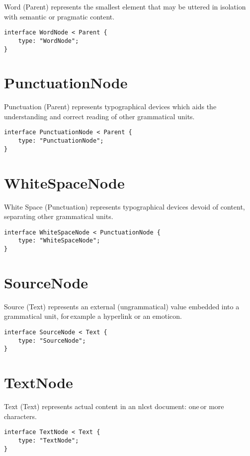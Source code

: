 Word (Parent) represents the smallest element that may be uttered in
isolation with semantic or pragmatic content.

\begin{lstlisting}
interface WordNode < Parent {
    type: "WordNode";
}
\end{lstlisting}

\section*{PunctuationNode}\label{punctuationnode}

Punctuation (Parent) represents typographical devices which aids the
understanding and correct reading of other grammatical units.

\begin{lstlisting}
interface PunctuationNode < Parent {
    type: "PunctuationNode";
}
\end{lstlisting}

\section*{WhiteSpaceNode}\label{whitespacenode}

White Space (Punctuation) represents typographical devices devoid of
content, separating other grammatical units.

\begin{lstlisting}
interface WhiteSpaceNode < PunctuationNode {
    type: "WhiteSpaceNode";
}
\end{lstlisting}

\section*{SourceNode}\label{sourcenode}

Source (Text) represents an external (ungrammatical) value embedded
into a grammatical unit, for\,example a hyperlink or an emoticon.

\begin{lstlisting}
interface SourceNode < Text {
    type: "SourceNode";
}
\end{lstlisting}

\section*{TextNode}\label{textnode}

Text (Text) represents actual content in an \gls{nlcst} document: one\,or more
characters.

\begin{lstlisting}
interface TextNode < Text {
    type: "TextNode";
}
\end{lstlisting}
